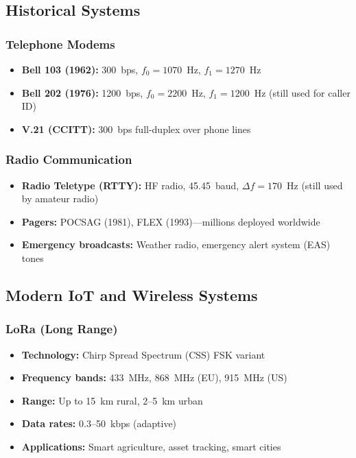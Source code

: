 \subsection{Historical Systems}

\subsubsection{Telephone Modems}

\begin{itemize}
\item \textbf{Bell 103 (1962):} 300~bps, $f_0 = 1070$~Hz, $f_1 = 1270$~Hz
\item \textbf{Bell 202 (1976):} 1200~bps, $f_0 = 2200$~Hz, $f_1 = 1200$~Hz (still used for caller ID)
\item \textbf{V.21 (CCITT):} 300~bps full-duplex over phone lines
\end{itemize}

\subsubsection{Radio Communication}

\begin{itemize}
\item \textbf{Radio Teletype (RTTY):} HF radio, 45.45~baud, $\Delta f = 170$~Hz (still used by amateur radio)
\item \textbf{Pagers:} POCSAG (1981), FLEX (1993)---millions deployed worldwide
\item \textbf{Emergency broadcasts:} Weather radio, emergency alert system (EAS) tones
\end{itemize}

\subsection{Modern IoT and Wireless Systems}

\subsubsection{LoRa (Long Range)}

\begin{itemize}
\item \textbf{Technology:} Chirp Spread Spectrum (CSS) FSK variant
\item \textbf{Frequency bands:} 433~MHz, 868~MHz (EU), 915~MHz (US)
\item \textbf{Range:} Up to 15~km rural, 2--5~km urban
\item \textbf{Data rates:} 0.3--50~kbps (adaptive)
\item \textbf{Applications:} Smart agriculture, asset tracking, smart cities
\end{itemize}

